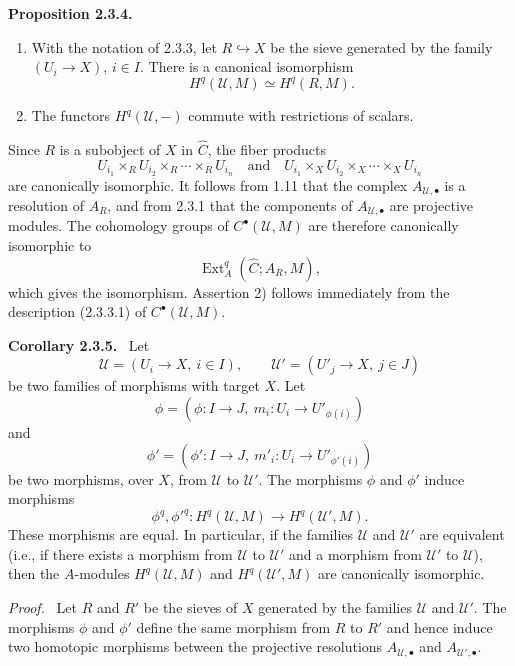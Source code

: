 \documentclass[11pt]{article}
\newcommand{\Ext}{\operatorname{Ext}}
\newcommand{\ie}{i.e.}
\newenvironment{statement}[1]{\par\medskip\noindent\textbf{#1.}\ }{\par\medskip}
\newenvironment{prooftext}{\par\noindent\emph{Proof.}\ }{\par\medskip}
\begin{document}
\begin{statement}{Proposition 2.3.4}
\begin{enumerate}[label=\arabic*)]
\item With the notation of 2.3.3, let $R\hookrightarrow X$ be the sieve generated by the family $(U_i\to X)$, $i\in I$. There is a canonical isomorphism
\[
H^q(\mathcal U,M)\simeq H^q(R,M).
\]
\item The functors $H^q(\mathcal U,-)$ commute with restrictions of scalars.
\end{enumerate}
\end{statement}

Since $R$ is a subobject of $X$ in $\widehat C$, the fiber products
\[
U_{i_1}\times_R U_{i_2}\times_R\cdots\times_R U_{i_n}
\quad\text{and}\quad
U_{i_1}\times_X U_{i_2}\times_X\cdots\times_X U_{i_n}
\]
are canonically isomorphic. It follows from 1.11 that the complex $A_{\mathcal U,\bullet}$ is a resolution of $A_R$, and from 2.3.1 that the components of $A_{\mathcal U,\bullet}$ are projective modules. The cohomology groups of $C^\bullet(\mathcal U,M)$ are therefore canonically isomorphic to
\[
\Ext_A^q(\widehat C;A_R,M),
\]
which gives the isomorphism. Assertion 2) follows immediately from the description (2.3.3.1) of $C^\bullet(\mathcal U,M)$.

\begin{statement}{Corollary 2.3.5}
Let
\[
\mathcal U=(U_i\to X,\ i\in I),\qquad
\mathcal U'=(U'_j\to X,\ j\in J)
\]
be two families of morphisms with target $X$. Let
\[
\phi=(\phi:I\to J,\ m_i:U_i\to U'_{\phi(i)})
\]
and
\[
\phi'=(\phi':I\to J,\ m'_i:U_i\to U'_{\phi'(i)})
\]
be two morphisms, over $X$, from $\mathcal U$ to $\mathcal U'$. The morphisms $\phi$ and $\phi'$ induce morphisms
\[
\phi^q,{\phi'}^q:H^q(\mathcal U,M)\longrightarrow H^q(\mathcal U',M).
\]
These morphisms are equal. In particular, if the families $\mathcal U$ and $\mathcal U'$ are equivalent (\ie, if there exists a morphism from $\mathcal U$ to $\mathcal U'$ and a morphism from $\mathcal U'$ to $\mathcal U$), then the $A$-modules $H^q(\mathcal U,M)$ and $H^q(\mathcal U',M)$ are canonically isomorphic.
\end{statement}

\begin{prooftext}
Let $R$ and $R'$ be the sieves of $X$ generated by the families $\mathcal U$ and $\mathcal U'$. The morphisms $\phi$ and $\phi'$ define the same morphism from $R$ to $R'$ and hence induce two homotopic morphisms between the projective resolutions $A_{\mathcal U,\bullet}$ and $A_{\mathcal U',\bullet}$.
\end{prooftext}
\end{document}
